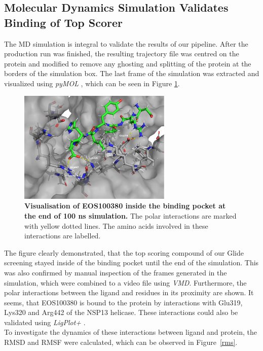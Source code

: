\documentclass[11pt, letterpaper, titlepage]{article}
\renewcommand{\cite}{\parencite}
\begin{document}
\subsection{Molecular Dynamics Simulation Validates Binding of Top Scorer}
The \ac{MD} simulation is integral to validate the results of our pipeline. After the production run was finished, the resulting trajectory file was centred on the protein and modified to remove any ghosting and splitting of the protein at the borders of the simulation box. The last frame of the simulation was extracted and visualized using \textit{pyMOL} \cite{PyMOL}, which can be seen in Figure \ref{MD.Annotated}.
\begin{figure}[h]
  \begin{center}
    \includegraphics[width=0.65\textwidth]{last_frame_render_annotated.pdf}
  \end{center}
  \caption{\textbf{Visualisation of EOS100380 inside the binding pocket at the end of 100 ns simulation.} The polar interactions are marked with yellow dotted lines. The amino acids involved in these interactions are labelled.}\label{MD.Annotated}
\end{figure}
The figure clearly demonstrated, that the top scoring compound of our Glide screening stayed inside of the binding pocket until the end of the simulation. This was also confirmed by manual inspection of the frames generated in the simulation, which were combined to a video file using \textit{VMD}. Furthermore, the polar interactions between the ligand and residues in its proximity are shown. It seems, that EOS100380 is bound to the protein by interactions with Glu319, Lys320 and Arg442 of the NSP13 helicase. These interactions could also be validated using \textit{LigPlot+} \cite{LigPlot}.\\
To investigate the dynamics of these interactions between ligand and protein, the \ac{RMSD} and \ac{RMSF} were calculated, which can be observed in Figure~\ref{rms}. 
\end{document}
